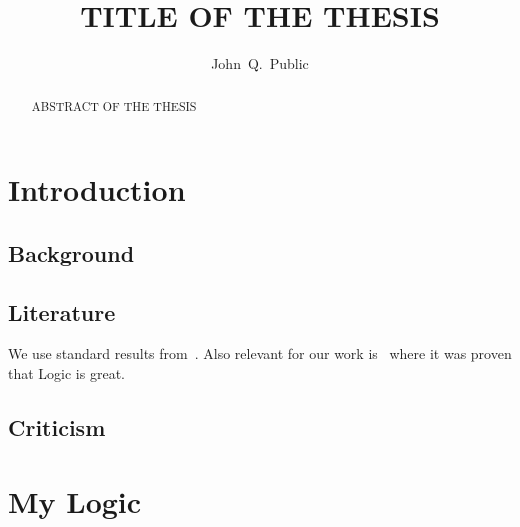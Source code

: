\documentclass[titlepage,a4paper,11pt]{report}
\begin{document}
\title{TITLE OF THE THESIS}
\author{John~Q.~Public}
\maketitle

\begin{abstract}
  ABSTRACT OF THE THESIS

  \lipsum[10-11]
\end{abstract}


\clearpage

\tableofcontents

\chapter{Introduction}

\lipsum[1]

\section{Background}\label{sec:background}

\lipsum[2]

\section{Literature}

We use standard results from~\cite{BRV2001:Modal}.
Also relevant for our work is~\cite{BB1999:IPGames} where it was proven that Logic is great.

\lipsum[3-10]

\section{Criticism}

\lipsum[11-12]

\chapter{My Logic}
\end{document}
